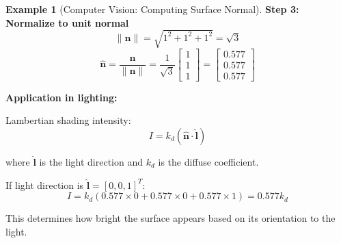 \documentclass[12pt,a4paper]{article}
\theoremstyle{definition}
\newtheorem{example}{Example}[section]
\begin{document}
\begin{example}[Computer Vision: Computing Surface Normal]
\textbf{Step 3: Normalize to unit normal}
\begin{equation}
\|\mathbf{n}\| = \sqrt{1^2 + 1^2 + 1^2} = \sqrt{3}
\end{equation}
\begin{equation}
\hat{\mathbf{n}} = \frac{\mathbf{n}}{\|\mathbf{n}\|} = \frac{1}{\sqrt{3}}\begin{bmatrix} 1 \\ 1 \\ 1 \end{bmatrix} = \begin{bmatrix} 0.577 \\ 0.577 \\ 0.577 \end{bmatrix}
\end{equation}

\textbf{Application in lighting:}

Lambertian shading intensity:
\begin{equation}
I = k_d (\hat{\mathbf{n}} \cdot \hat{\mathbf{l}})
\end{equation}

where $\hat{\mathbf{l}}$ is the light direction and $k_d$ is the diffuse coefficient.

If light direction is $\hat{\mathbf{l}} = [0, 0, 1]^T$:
\begin{equation}
I = k_d (0.577 \times 0 + 0.577 \times 0 + 0.577 \times 1) = 0.577 k_d
\end{equation}

This determines how bright the surface appears based on its orientation to the light.
\end{example}
\end{document}
